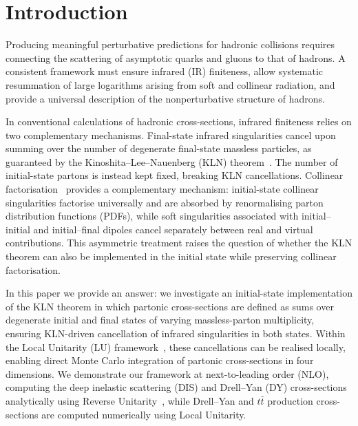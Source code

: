 \documentclass[%
 reprint,
 amsmath,amssymb,
 superscriptaddress,
 aps,
 preprintnumbers,
prl,
floatfix,
]{revtex4-2}
\let\label\latexKernelLabel
\begin{document}
\section{Introduction}
\label{sec:introduction}

Producing meaningful perturbative predictions for hadronic collisions requires connecting the scattering of asymptotic quarks and gluons to that of hadrons. A consistent framework must ensure infrared (IR) finiteness, allow systematic resummation of large logarithms arising from soft and collinear radiation, and provide a universal description of the nonperturbative structure of hadrons.

In conventional calculations of hadronic cross-sections, infrared finiteness relies on two complementary mechanisms. 
Final-state infrared singularities cancel upon summing over the number of degenerate final-state massless particles, as guaranteed by the Kinoshita--Lee--Nauenberg (KLN) theorem~\cite{Kinoshita:1962ur,PhysRev.133.B1549}. The number of initial-state partons is instead kept fixed, breaking KLN cancellations. Collinear factorisation~\cite{PhysRevD.8.3633,DAVIDPOLITZER1974129,Altarelli:1979ub,Collins:1981ta,Collins:1981tt,Collins:1983ju,Collins:1983pk,Collins:1985ue,Collins:1989gx,Bodwin:1984hc,Ellis:1978ty} provides a complementary mechanism: initial-state collinear singularities factorise universally and are absorbed by renormalising parton distribution functions (PDFs), while soft singularities associated with initial--initial and initial--final dipoles cancel separately between real and virtual contributions. This asymmetric treatment raises the question of whether the KLN theorem can also be implemented in the initial state while preserving collinear factorisation.

In this paper we provide an answer: we investigate an initial-state implementation of the KLN theorem in which partonic cross-sections are defined as sums over degenerate initial and final states of varying massless-parton multiplicity, ensuring KLN-driven cancellation of infrared singularities in both states. Within the Local Unitarity (LU) framework~\cite{Capatti:2020xjc,Capatti:2021bsm,Capatti:2022tit,Capatti:2025khs}, these cancellations can be realised locally, enabling direct Monte Carlo integration of partonic cross-sections in four dimensions. We demonstrate our framework at next-to-leading order (NLO), computing the deep inelastic scattering (DIS) and Drell--Yan (DY) cross-sections analytically using Reverse Unitarity~\cite{Anastasiou:2002qz,Anastasiou:2002yz,Anastasiou:2003yy,Anastasiou:2013mca,Anastasiou:2013srw}, while Drell--Yan and $t\bar{t}$ production cross-sections are computed numerically using Local Unitarity.
\end{document}
